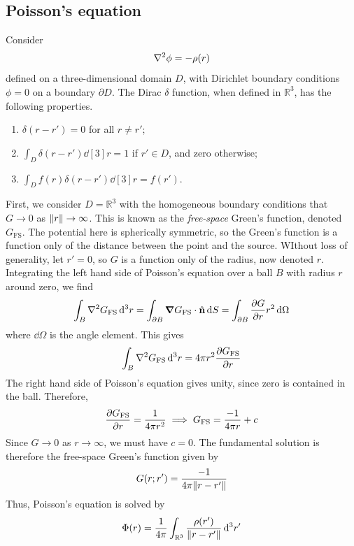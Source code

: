 \documentclass[a4paper]{article}
\begin{document}
\subsection{Poisson's equation}
Consider
\[
	\laplacian{\phi} = - \rho(r)
\]
defined on a three-dimensional domain \( D \), with Dirichlet boundary conditions \( \phi = 0 \) on a boundary \( \partial D \).
The Dirac \( \delta \) function, when defined in \( \mathbb R^3 \), has the following properties.
\begin{enumerate}
	\item \( \delta(r - r') = 0 \) for all \( r \neq r' \);
	\item \( \int_D \delta(r - r') \dd[3]{r} = 1 \) if \( r' \in D \), and zero otherwise;
	\item \( \int_D f(r) \delta(r - r') \dd[3]{r} = f(r') \).
\end{enumerate}
First, we consider \( D = \mathbb R^3 \) with the homogeneous boundary conditions that \( G \to 0 \) as \( \norm{r} \to \infty \).
This is known as the \textit{free-space} Green's function, denoted \( G_{\mathrm{FS}} \).
The potential here is spherically symmetric, so the Green's function is a function only of the distance between the point and the source.
WIthout loss of generality, let \( r' = 0 \), so \( G \) is a function only of the radius, now denoted \( r \).
Integrating the left hand side of Poisson's equation over a ball \( B \) with radius \( r \) around zero, we find
\[
	\int_B \laplacian{G_{\mathrm{FS}}} \dd[3]{r} = \int_{\partial B} \grad{G_{\mathrm{FS}}} \cdot \hat \bfn \dd{S} = \int_{\partial B} \pdv{G}{r} r^2 \dd{\Omega}
\]
where \( \dd{\Omega} \) is the angle element.
This gives
\[
	\int_B \laplacian{G_{\mathrm{FS}}} \dd[3]{r} = 4 \pi r^2 \pdv{G_{\mathrm{FS}}}{r}
\]
The right hand side of Poisson's equation gives unity, since zero is contained in the ball.
Therefore,
\[
	\pdv{G_{\mathrm{FS}}}{r} = \frac{1}{4 \pi r^2} \implies G_{\mathrm{FS}} = \frac{-1}{4 \pi r} + c
\]
Since \( G \to 0 \) as \( r \to \infty \), we must have \( c = 0 \).
The fundamental solution is therefore the free-space Green's function given by
\[
	G(r; r') = \frac{-1}{4 \pi \norm{r - r'}}
\]
Thus, Poisson's equation is solved by
\[
	\Phi(r) = \frac{1}{4 \pi} \int_{\mathbb R^3} \frac{\rho(r')}{\norm{r - r'}} \dd[3]{r'}
\]
\end{document}
